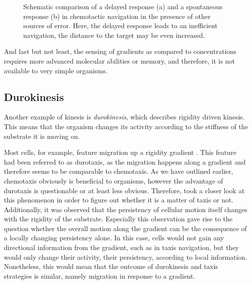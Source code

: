 \begin{figure}[bth]
    \myfloatalign
     \quad
    \caption[]{Schematic comparison of a delayed response (a) and a spontaneous response (b) in chemotactic navigation in the presence of other sources of error. Here, the delayed response leads to an inefficient navigation, \ie the distance to the target may be even increased.}\label{fig:chemotacticResponse}
\end{figure}

And last but not least, the sensing of gradients as compared to concentrations requires more advanced molecular abilities or memory, and therefore, it is not available to very simple organisms.

\subsection{Durokinesis}
Another example of kinesis is \textit{durokinesis}, which describes rigidity driven kinesis. This means that the organism changes its activity according to the stiffness of the substrate it is moving on.

Most cells, for example, feature migration up a rigidity gradient \cite{novikova:2017}. This feature had been referred to as durotaxis, as the migration happens along a gradient and therefore seems to be comparable to chemotaxis. As we have outlined earlier, chemotaxis obviously is beneficial to organisms, however the advantage of durotaxis is questionable or at least less obvious. Therefore,  took a closer look at this phenomenon in order to figure out whether it is a matter of taxis or not. Additionally, it was observed that the persistency of cellular motion itself changes with the rigidity of the substrate. Especially this observation gave rise to the question whether the overall motion along the gradient can be the consequence of a locally changing persistency alone. In this case, cells would not gain any directional information from the gradient, such as in taxis navigation, but they would only change their activity, \ie their persistency, according to local information. Nonetheless, this would mean that the outcome of durokinesis and taxis strategies is similar, namely migration in response to a gradient.

